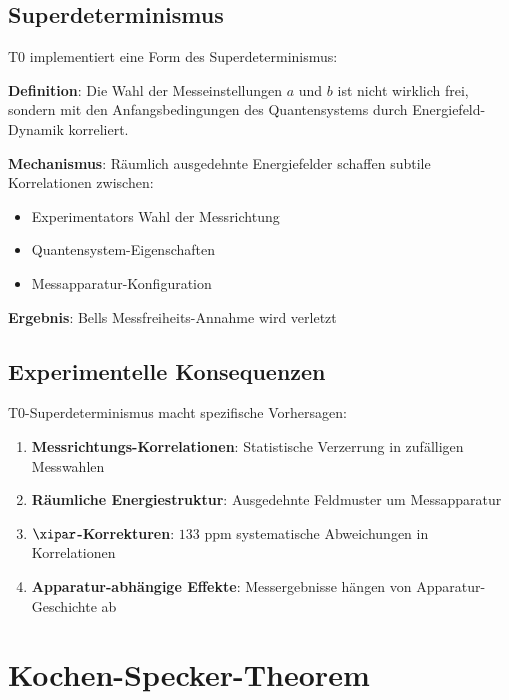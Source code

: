 	\subsection{Superdeterminismus}
	
	T0 implementiert eine Form des Superdeterminismus:
	
	\begin{tcolorbox}[colback=blue!5!white,colframe=blue!75!black,title=T0-Superdeterminismus]
		\textbf{Definition}: Die Wahl der Messeinstellungen $a$ und $b$ ist nicht wirklich frei, sondern mit den Anfangsbedingungen des Quantensystems durch Energiefeld-Dynamik korreliert.
		
		\textbf{Mechanismus}: Räumlich ausgedehnte Energiefelder schaffen subtile Korrelationen zwischen:
		\begin{itemize}
			\item Experimentators Wahl der Messrichtung
			\item Quantensystem-Eigenschaften
			\item Messapparatur-Konfiguration
		\end{itemize}
		
		\textbf{Ergebnis}: Bells Messfreiheits-Annahme wird verletzt
	\end{tcolorbox}
	
	\subsection{Experimentelle Konsequenzen}
	
	T0-Superdeterminismus macht spezifische Vorhersagen:
	
	\begin{enumerate}
		\item \textbf{Messrichtungs-Korrelationen}: Statistische Verzerrung in zufälligen Messwahlen
		\item \textbf{Räumliche Energiestruktur}: Ausgedehnte Feldmuster um Messapparatur
		\item \textbf{$\xipar$-Korrekturen}: $133$ ppm systematische Abweichungen in Korrelationen
		\item \textbf{Apparatur-abhängige Effekte}: Messergebnisse hängen von Apparatur-Geschichte ab
	\end{enumerate}
	
	\section{Kochen-Specker-Theorem}
	

